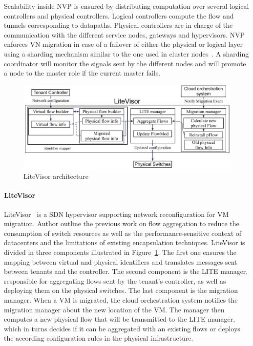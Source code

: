 Scalability inside NVP is ensured by distributing computation over several logical controllers and physical controllers. Logical controllers compute the flow and tunnels corresponding to datapaths. Physical controllers are in charge of the communication with the different service nodes, gateways and hypervisors.
NVP enforces VN migration in case of a failover of either the physical or logical layer using a sharding mechanism similar to the one used in cluster nodes~\cite{sharding}. 
A sharding coordinator will monitor the signals sent by the different nodes and will promote a node to the master role if the current master fails.


\begin{figure}
    \centering
    \includegraphics[scale=0.5]{figures/litevisor.png}
    \caption{LiteVisor architecture~\cite{Litevisor-Yang2018}}
    \label{fig:litevisor}
\end{figure}

\paragraph{LiteVisor}
LiteVisor~\cite{Litevisor-Yang2018} is a SDN hypervisor supporting network reconfiguration for VM migration.
Author outline the previous work on flow aggregation to reduce the consumption of switch resources as well as the performance-sensitive context of datacenters and the limitations of existing encapsulation techniques.
LiteVisor is divided in three components illustrated in Figure~\ref{fig:litevisor}. The first one ensures the mapping between virtual and physical identifiers and translates messages sent between tenants and the controller.
The second component is the LITE manager, responsible for aggregating flows sent by the tenant's controller, as well as deploying them on the physical switches. 
The last component is the migration manager. When a VM is migrated, the cloud orchestration system notifies the migration manager about the new location of the VM. The manager then computes a new physical flow that will be transmitted to the LITE manager, which in turns decides if it can be aggregated with an existing flows or deploys the according configuration rules in the physical infrastructure.

